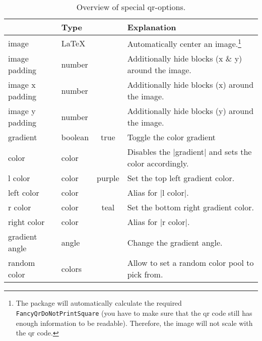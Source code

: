\documentclass[parskip=half,english,numbers=noenddot,footnotes=nomultiple,oneside]{scrartcl}
\def\ltx#1{\lstinline/#1/}
\begin{document}
	\begin{savenotes}
	\begin{table}
		\centering\begin{tabular}{>{\ttfamily}ll>{\ttfamily}cp{.5\linewidth}}
			\toprule
			\multicolumn{1}{l}{Option} & Type & \multicolumn{1}{c}{Default} & Explanation \\
			\midrule
			image           & \LaTeX   &          & Automatically center an image.\footnote{The package will automatically calculate the required \ltx{\\FancyQrDoNotPrintSquare} (you have to make sure that the qr code still has enough information to be readable). Therefore, the image will not scale with the qr code.} \\
			image padding   & number  &          & Additionally hide blocks (x \& y) around the image.          \\
			image x padding & number  &   0      & Additionally hide blocks (x) around the image.               \\
			image y padding & number  &   0      & Additionally hide blocks (y) around the image.               \\
			gradient        & boolean &   true   & Toggle the color gradient                                    \\
			color           & color   &          & Disables the |gradient| and sets the color accordingly.      \\
			l color         & color   & purple   & Set the top left gradient color.                             \\
			left color      & color   &          & Alias for |l color|.                                         \\
			r color         & color   &  teal    & Set the bottom right gradient color.                         \\
			right color     & color   &          & Alias for |r color|.                                         \\
			gradient angle  & angle   &  135     & Change the gradient angle.                                   \\
			random color    & colors  &          & Allow to set a random color pool to pick from.               \\
			\bottomrule
		\end{tabular}
		\caption{Overview of special qr-options.}
		\label{tbl:extra-keys}
	\end{table}
	\end{savenotes}
\end{document}

